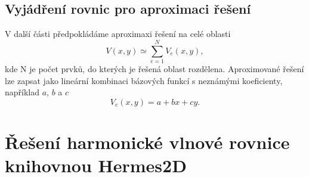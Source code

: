 \subsection*{Vyjádření rovnic pro aproximaci řešení}
V další části předpokládáme aproximaxi řešení na celé oblasti 
\begin{displaymath}
V(x,y) \simeq \sum_{e=1}^{N}V_e(x,y),
\end{displaymath}
kde N je počet prvků, do kterých je řešená oblast rozdělena. Aproximované řešení lze zapsat jako lineární kombinaci bázových funkcí s neznámými koeficienty, například $a$, $b$ a $c$
\begin{displaymath}
V_e(x,y) = a + bx + cy.
\end{displaymath}



\section{Řešení harmonické vlnové rovnice knihovnou Hermes2D} \label{sec:sim_hermes2d}
